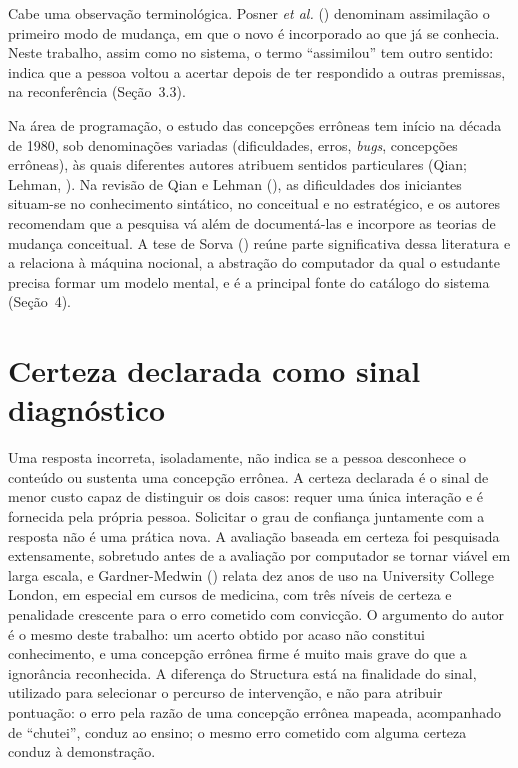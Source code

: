 Cabe uma observação terminológica. Posner \textit{et al.} (\citeyear{posner1982}) denominam assimilação o primeiro modo de mudança, em que o novo é incorporado ao que já se conhecia. Neste trabalho, assim como no sistema, o termo ``assimilou'' tem outro sentido: indica que a pessoa voltou a acertar depois de ter respondido a outras premissas, na reconferência (Seção~3.3).

Na área de programação, o estudo das concepções errôneas tem início na década de 1980, sob denominações variadas (dificuldades, erros, \textit{bugs}, concepções errôneas), às quais diferentes autores atribuem sentidos particulares (Qian; Lehman, \citeyear{qian2017}). Na revisão de Qian e Lehman (\citeyear{qian2017}), as dificuldades dos iniciantes situam-se no conhecimento sintático, no conceitual e no estratégico, e os autores recomendam que a pesquisa vá além de documentá-las e incorpore as teorias de mudança conceitual. A tese de Sorva (\citeyear{sorva2012}) reúne parte significativa dessa literatura e a relaciona à máquina nocional, a abstração do computador da qual o estudante precisa formar um modelo mental, e é a principal fonte do catálogo do sistema (Seção~4).

\section{Certeza declarada como sinal diagnóstico}

Uma resposta incorreta, isoladamente, não indica se a pessoa desconhece o conteúdo ou sustenta uma concepção errônea. A certeza declarada é o sinal de menor custo capaz de distinguir os dois casos: requer uma única interação e é fornecida pela própria pessoa. Solicitar o grau de confiança juntamente com a resposta não é uma prática nova. A avaliação baseada em certeza foi pesquisada extensamente, sobretudo antes de a avaliação por computador se tornar viável em larga escala, e Gardner-Medwin (\citeyear{gardnermedwin2006}) relata dez anos de uso na University College London, em especial em cursos de medicina, com três níveis de certeza e penalidade crescente para o erro cometido com convicção. O argumento do autor é o mesmo deste trabalho: um acerto obtido por acaso não constitui conhecimento, e uma concepção errônea firme é muito mais grave do que a ignorância reconhecida. A diferença do Structura está na finalidade do sinal, utilizado para selecionar o percurso de intervenção, e não para atribuir pontuação: o erro pela razão de uma concepção errônea mapeada, acompanhado de ``chutei'', conduz ao ensino; o mesmo erro cometido com alguma certeza conduz à demonstração.

